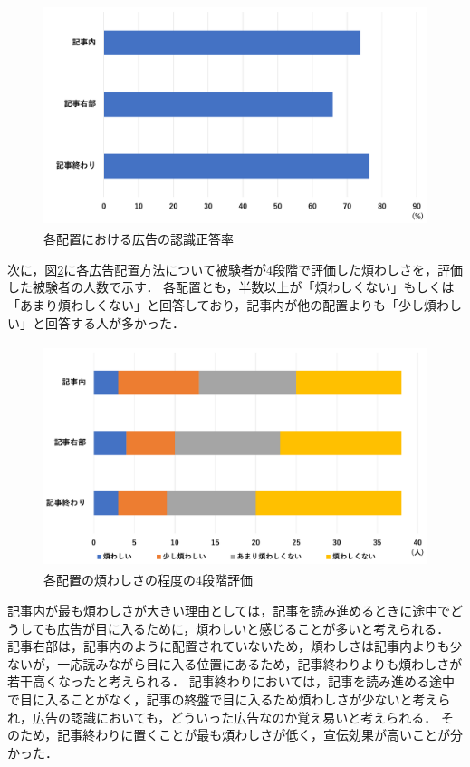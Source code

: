 \documentclass[12pt,a4j,titlepage]{ltjsarticle}
\begin{document}
\begin{figure}[H]
\begin{center}
 \includegraphics[height=65mm]{figures/広告認識正答率_1.pdf}
\end{center}
 \caption{各配置における広告の認識正答率}
 \label{fig:広告認識正答率_1}
\end{figure}

次に，図\ref{fig:煩わしさ_1}に各広告配置方法について被験者が4段階で評価した煩わしさを，評価した被験者の人数で示す．
各配置とも，半数以上が「煩わしくない」もしくは「あまり煩わしくない」と回答しており，記事内が他の配置よりも「少し煩わしい」と回答する人が多かった．

\begin{figure}[H]
\begin{center}
 \includegraphics[height=65mm]{figures/煩わしさ_1.pdf}
\end{center}
 \caption{各配置の煩わしさの程度の4段階評価}
 \label{fig:煩わしさ_1}
\end{figure}

記事内が最も煩わしさが大きい理由としては，記事を読み進めるときに途中でどうしても広告が目に入るために，煩わしいと感じることが多いと考えられる．
記事右部は，記事内のように配置されていないため，煩わしさは記事内よりも少ないが，一応読みながら目に入る位置にあるため，記事終わりよりも煩わしさが若干高くなったと考えられる．
記事終わりにおいては，記事を読み進める途中で目に入ることがなく，記事の終盤で目に入るため煩わしさが少ないと考えられ，広告の認識においても，どういった広告なのか覚え易いと考えられる．
そのため，記事終わりに置くことが最も煩わしさが低く，宣伝効果が高いことが分かった．
\end{document}
